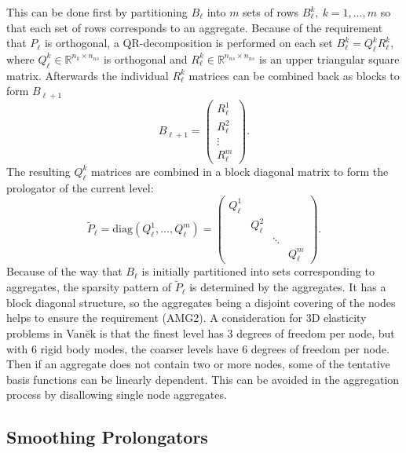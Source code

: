 This can be done first by partitioning $B_\ell$ into $m$ sets of rows $B_\ell^k,\ k = 1, \ldots, m$ so that each set of rows corresponds to an aggregate. Because of the requirement that $P_\ell$ is orthogonal, a QR-decomposition is performed on each set $B_\ell^{k} = Q_\ell^k R_\ell^k$, where $Q_\ell^k \in \mathbb{R}^{n_k \times n_{ns}}$ is orthogonal and $R_\ell^k \in \mathbb{R}^{n_{ns} \times n_{ns}}$ is an upper triangular square matrix. Afterwards the individual $R_\ell^k$ matrices can be combined back as blocks to form $B_{\ell+1}$
\begin{equation}
	B_{\ell+1} =
	\begin{pmatrix}
		R_\ell^1 \\
		R_\ell^2 \\
		\vdots \\
		R_\ell^m
	\end{pmatrix}.
\end{equation}
The resulting $Q_\ell^k$ matrices are combined in a block diagonal matrix to form the prologator of the current level:
\begin{equation}
	\tilde{P}_\ell = \text{diag}\left(Q_\ell^1, \ldots, Q_\ell^m\right) =
	\begin{pmatrix}
		Q_\ell^1 &          &        & \\
		         & Q_\ell^2 &        & \\
				 &          & \ddots & \\
				 &          &        & Q_\ell^m
	\end{pmatrix}.
\end{equation}
Because of the way that $B_\ell$ is initially partitioned into sets corresponding to aggregates, the sparsity pattern of $\tilde{P}_\ell$ is determined by the aggregates. It has a block diagonal structure, so the aggregates being a disjoint covering of the nodes helps to ensure the requirement (AMG2). A consideration for 3D elasticity problems in Van\u{e}k is that the finest level has 3 degrees of freedom per node, but with 6 rigid body modes, the coarser levels have 6 degrees of freedom per node. Then if an aggregate does not contain two or more nodes, some of the tentative basis functions can be linearly dependent. This can be avoided in the aggregation process by disallowing single node aggregates.

\subsection{Smoothing Prolongators}

